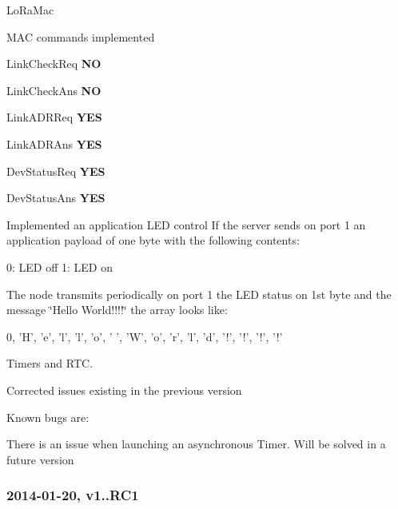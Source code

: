 \begin{DoxyItemize}
\item Lo\+Ra\+Mac
\begin{DoxyEnumerate}
\item M\+AC commands implemented
\begin{DoxyItemize}
\item Link\+Check\+Req {\bfseries NO}
\item Link\+Check\+Ans {\bfseries NO}
\item Link\+A\+D\+R\+Req {\bfseries Y\+ES}
\item Link\+A\+D\+R\+Ans {\bfseries Y\+ES}
\item Dev\+Status\+Req {\bfseries Y\+ES}
\item Dev\+Status\+Ans {\bfseries Y\+ES}
\end{DoxyItemize}
\item Implemented an application L\+ED control If the server sends on port 1 an application payload of one byte with the following contents\+: \begin{DoxyVerb}0: LED off
1: LED on
\end{DoxyVerb}
 The node transmits periodically on port 1 the L\+ED status on 1st byte and the message \char`\"{}\+Hello World!!!!\char`\"{} the array looks like\+: \begin{DoxyVerb}{ 0, 'H', 'e', 'l', 'l', 'o', ' ', 'W', 'o', 'r', 'l', 'd', '!', '!', '!', '!' }
\end{DoxyVerb}

\end{DoxyEnumerate}
\item Timers and R\+TC.
\begin{DoxyEnumerate}
\item Corrected issues existing in the previous version
\item Known bugs are\+:
\begin{DoxyItemize}
\item There is an issue when launching an asynchronous Timer. Will be solved in a future version
\end{DoxyItemize}
\end{DoxyEnumerate}
\end{DoxyItemize}

\subsubsection*{2014-\/01-\/20, v1..\+R\+C1}


